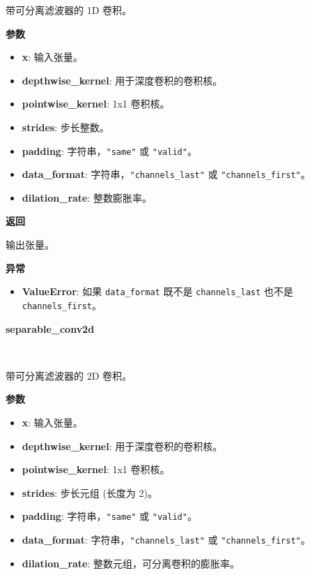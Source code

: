 带可分离滤波器的 1D 卷积。

\textbf{参数}

\begin{itemize}
\tightlist
\item
  \textbf{x}: 输入张量。
\item
  \textbf{depthwise\_kernel}: 用于深度卷积的卷积核。
\item
  \textbf{pointwise\_kernel}: 1x1 卷积核。
\item
  \textbf{strides}: 步长整数。
\item
  \textbf{padding}: 字符串，\texttt{"same"} 或 \texttt{"valid"}。
\item
  \textbf{data\_format}: 字符串，\texttt{"channels\_last"} 或
  \texttt{"channels\_first"}。
\item
  \textbf{dilation\_rate}: 整数膨胀率。
\end{itemize}

\textbf{返回}

输出张量。

\textbf{异常}

\begin{itemize}
\tightlist
\item
  \textbf{ValueError}: 如果 \texttt{data\_format} 既不是
  \texttt{channels\_last} 也不是 \texttt{channels\_first}。
\end{itemize}


\textbf{separable\_conv2d}\label{separableux5fconv2d}

\begin{Shaded}
\begin{Highlighting}[]
\OperatorTok{=}\\
\hspace{3cm}\NormalTok{(}\NormalTok{, }\OperatorTok{=}\OperatorTok{=}\OperatorTok{=}\NormalTok{(}\NormalTok{, }\NormalTok{))}
\end{Highlighting}
\end{Shaded}

带可分离滤波器的 2D 卷积。

\textbf{参数}

\begin{itemize}
\tightlist
\item
  \textbf{x}: 输入张量。
\item
  \textbf{depthwise\_kernel}: 用于深度卷积的卷积核。
\item
  \textbf{pointwise\_kernel}: 1x1 卷积核。
\item
  \textbf{strides}: 步长元组 (长度为 2)。
\item
  \textbf{padding}: 字符串，\texttt{"same"} 或 \texttt{"valid"}。
\item
  \textbf{data\_format}: 字符串，\texttt{"channels\_last"} 或
  \texttt{"channels\_first"}。
\item
  \textbf{dilation\_rate}: 整数元组，可分离卷积的膨胀率。
\end{itemize}

